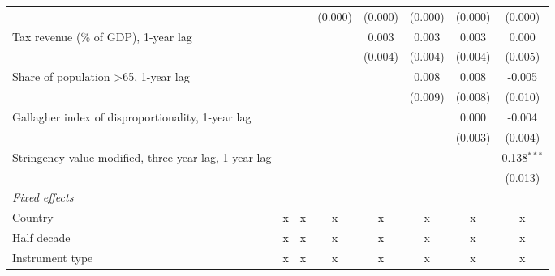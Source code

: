 \begin{tabular}{lccccccc}
                                                                             &              &              & (0.000)      & (0.000)      & (0.000)      & (0.000)      & (0.000)\\   
   Tax revenue (\% of GDP), 1-year lag                                       &              &              &              & 0.003        & 0.003        & 0.003        & 0.000\\   
                                                                             &              &              &              & (0.004)      & (0.004)      & (0.004)      & (0.005)\\   
   Share of population >65, 1-year lag                                       &              &              &              &              & 0.008        & 0.008        & -0.005\\   
                                                                             &              &              &              &              & (0.009)      & (0.008)      & (0.010)\\   
   Gallagher index of disproportionality, 1-year lag                         &              &              &              &              &              & 0.000        & -0.004\\   
                                                                             &              &              &              &              &              & (0.003)      & (0.004)\\   
   Stringency value modified, three-year lag, 1-year lag                     &              &              &              &              &              &              & 0.138$^{***}$\\   
                                                                             &              &              &              &              &              &              & (0.013)\\   
   \emph{Fixed effects}\\
   Country                                                                   & x            & x            & x            & x            & x            & x            & x\\  
   Half decade                                                               & x            & x            & x            & x            & x            & x            & x\\  
   Instrument type                                                           & x            & x            & x            & x            & x            & x            & x\\  

\end{tabular}
